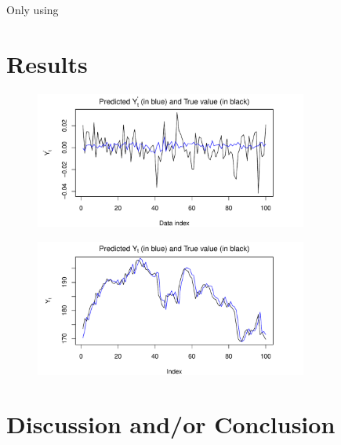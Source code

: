 \documentclass[conference,onecolumn,11pt]{IEEEtran}
\begin{document}
Only using 


\section{Results}

\begin{figure}[htpb]
	\centering
	\includegraphics[width=0.8\textwidth]{pic/Predicted_dAdjColsed.pdf}
	\caption{}
	\label{fig:pred_dprice}
\end{figure}

\begin{figure}[htpb]
	\centering
	\includegraphics[width=0.8\textwidth]{pic/Predicted_AdjColsed.pdf}
	\caption{}
	\label{fig:pred_price}
\end{figure}

\section{Discussion and/or Conclusion}


\printbibliography

\vspace{12pt}
\end{document}
